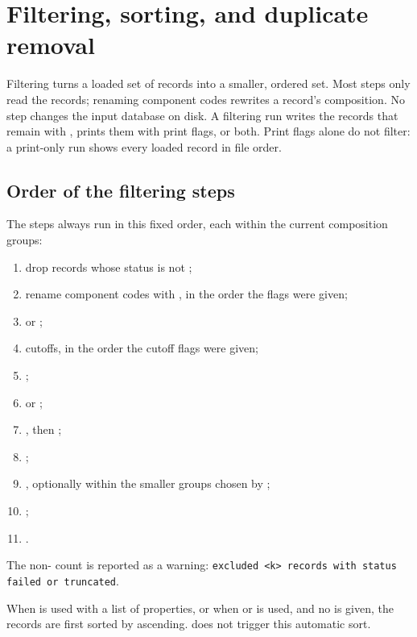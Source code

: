\section{Filtering, sorting, and duplicate removal}\label{sec:filtering}

Filtering turns a loaded set of records into a smaller, ordered set. Most steps
only read the records; renaming component codes rewrites a record's
composition. No step changes the input database on disk. A filtering run writes
the records that remain with , prints them with print flags, or both.
Print flags alone do not filter: a print-only run shows every loaded record in
file order.

\subsection{Order of the filtering steps}\label{sec:pipeline-order}

The steps always run in this fixed order, each within the current composition
groups:

\begin{enumerate}
  \item drop records whose status is not ;
  \item rename component codes with , in the order the flags were
        given;
  \item {} or ;
  \item cutoffs, in the order the cutoff flags were given;
  \item {};
  \item {} or ;
  \item {}, then ;
  \item {};
  \item {}, optionally within the smaller groups chosen by
        ;
  \item {};
  \item {}.
\end{enumerate}

The non- count is reported as a warning:
\texttt{excluded <k> records with status failed or truncated}.

When  is used with a list of properties, or when 
or  is used, and no  is given, the records are
first sorted by  ascending.  does not trigger this
automatic sort.

